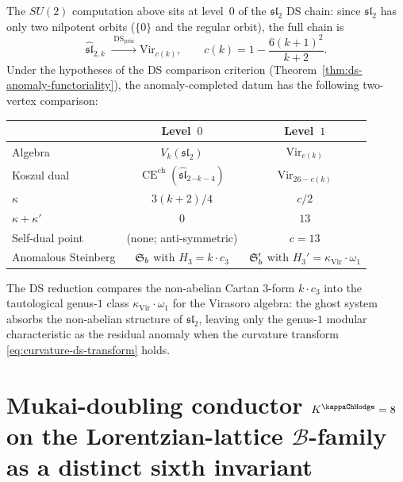 \begin{remark}
\label{rem:su2-vs-sl3-chain}
The $SU(2)$ computation above sits at level~$0$ of the
$\mathfrak{sl}_2$ DS chain: since $\mathfrak{sl}_2$ has only two
nilpotent orbits ($\{0\}$ and the regular orbit), the full chain is
\[
\widehat{\mathfrak{sl}}_{2,k}
\;\xrightarrow{\;\mathrm{DS}_{\mathrm{prin}}\;}
\mathrm{Vir}_{c(k)},
\qquad
c(k) = 1-\frac{6(k+1)^2}{k+2}.
\]
Under the hypotheses of the DS comparison criterion
(Theorem~\ref{thm:ds-anomaly-functoriality}), the anomaly-completed
datum has the following two-vertex comparison:
\begin{center}
\renewcommand{\arraystretch}{1.2}
\begin{tabular}{lcc}
& \textbf{Level~$0$} & \textbf{Level~$1$} \\
\hline
Algebra & $V_k(\mathfrak{sl}_2)$ & $\mathrm{Vir}_{c(k)}$ \\[2pt]
Koszul dual & $\operatorname{CE}^{\mathrm{ch}}(\widehat{\mathfrak{sl}}_2{}_{-k-4})$ & $\mathrm{Vir}_{26-c(k)}$ \\[2pt]
$\kappa$ & $3(k+2)/4$ & $c/2$ \\[2pt]
$\kappa+\kappa'$ & $0$ & $13$ \\[2pt]
Self-dual point & (none; anti-symmetric) & $c=13$ \\[2pt]
Anomalous Steinberg & $\mathfrak{S}_b$ with $H_3=k\cdot c_3$ & $\mathfrak{S}_b'$ with
 $H_3'=\kappa_{\mathrm{Vir}}\cdot\omega_1$
\end{tabular}
\end{center}
The DS reduction compares the non-abelian Cartan $3$-form
$k\cdot c_3$ into the tautological genus-$1$ class
$\kappa_{\mathrm{Vir}}\cdot\omega_1$ for the Virasoro algebra:
the ghost system absorbs the non-abelian structure of
$\mathfrak{sl}_2$, leaving only the genus-$1$ modular
characteristic as the residual anomaly when the curvature transform
\eqref{eq:curvature-ds-transform} holds.
\end{remark}

\section{Mukai-doubling conductor $K^{\kappaChHodge} = 8$
on the Lorentzian-lattice $\mathcal{B}$-family
as a distinct sixth invariant}
\label{sec:ac-comparison-supplement}

